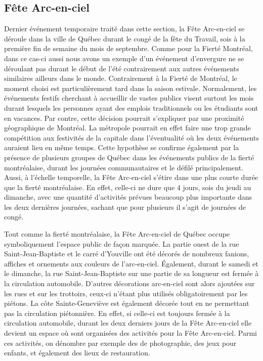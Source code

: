\subsection{Fête Arc-en-ciel}
\label{subsec:fetearcenciel}
Dernier événement temporaire traité dans cette section, la Fête Arc-en-ciel se déroule dans la ville de Québec durant le congé de la fête du Travail, sois à la première fin de semaine du mois de septembre.
Comme pour la Fierté Montréal, dans ce cas-ci aussi nous avons un exemple d'un événement d'envergure ne se déroulant pas durant le début de l'été contrairement aux autres événements similaires ailleurs dans le monde.
Contrairement à la Fierté de Montréal, le moment choisi est particulièrement tard dans la saison estivale.
Normalement, les événements festifs cherchant à accueillir de vastes publics visent surtout les mois durant lesquels les personnes ayant des emplois traditionnels ou les étudiants sont en vacances.
Par contre, cette décision pourrait s'expliquer par une proximité géographique de Montréal.
La métropole pourrait en effet faire une trop grande compétition aux festivités de la capitale dans l'éventualité où les deux événements auraient lieu en même temps.
Cette hypothèse se confirme également par la présence de plusieurs groupes de Québec dans les événements publics de la fierté montréalaise, durant les journées communautaires et le défilé principalement.
Aussi, à l'échelle temporelle, la Fête Arc-en-ciel s'étire dans une plus courte durée que la fierté montréalaise.
En effet, celle-ci ne dure que 4 jours, sois du jeudi au dimanche, avec une quantité d'activités prévues beaucoup plus importante dans les deux dernières journées, sachant que pour plusieurs il s'agit de journées de congé.

Tout comme la fierté montréalaise, la Fête Arc-en-ciel de Québec occupe symboliquement l'espace public de façon marquée.
La partie ouest de la rue Saint-Jean-Baptiste et le carré d'Youville ont été décorés de nombreux fanions, affiches et ornements aux couleurs de l'arc-en-ciel.
Également, durant le samedi et le dimanche, la rue Saint-Jean-Baptiste sur une partie de sa longueur est fermée à la circulation automobile.
D'autres décorations arc-en-ciel sont alors ajoutées sur les rues et sur les trottoirs, ceux-ci n'étant plus utilisés obligatoirement par les piétons.
La côte Sainte-Geneviève est également décorée tout en ne permettant pas la circulation piétonnière.
En effet, si celle-ci est toujours fermée à la circulation automobile, durant les deux derniers jours de la Fête Arc-en-ciel elle devient un espace où sont organisées des activités pour la Fête Arc-en-ciel. Parmi ces activités, on dénombre par exemple des  de photographie, des jeux pour enfants, et également des lieux de restauration.

